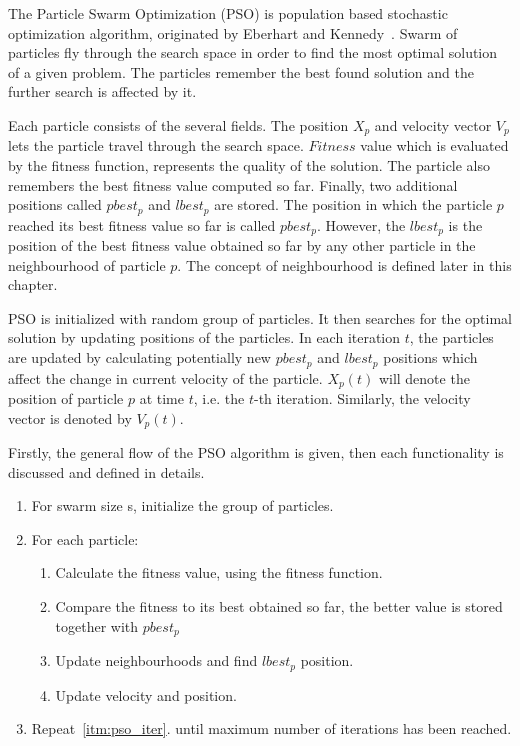 \documentclass{book}
\begin{document}
The Particle Swarm Optimization (PSO) is population based stochastic optimization algorithm, originated by Eberhart and Kennedy~\cite{pso_origin}. Swarm of particles fly through the search space in order to find the most optimal solution of a given problem. The particles remember the best found solution and the further search is affected by it.

Each particle consists of the several fields. The position $X_p$ and velocity vector $V_p$ lets the particle travel through the search space. $Fitness$ value which is evaluated by the fitness function, represents the quality of the solution. The particle also remembers the best fitness value computed so far. Finally, two additional positions called $pbest_p$ and $lbest_p$ are stored. The position in which the particle $p$ reached its best fitness value so far is called $pbest_p$. However, the $lbest_p$ is the position of the best fitness value obtained so far by any other particle in the neighbourhood of particle $p$. The concept of neighbourhood is defined later in this chapter.

PSO is initialized with random group of particles. It then searches for the optimal solution by updating positions of the particles.
In each iteration $t$, the particles are updated by calculating potentially new $pbest_p$ and $lbest_p$ positions which affect the change in current velocity of the particle. $X_p(t)$ will denote the position of particle $p$ at time $t$, i.e. the $t$-th iteration. Similarly, the velocity vector is denoted by $V_p(t)$.

Firstly, the general flow of the PSO algorithm is given, then each functionality is discussed and defined in details.

\begin{center}
    
    \begin{enumerate}
        \item For swarm size s, initialize the group of particles.
        
        \item For each particle: \label{itm:pso_iter}
        \begin{enumerate}
            \item Calculate the fitness value, using the fitness function.
            \item Compare the fitness to its best obtained so far, the better value is stored together with $pbest_p$	
            
            \item Update neighbourhoods and find $lbest_p$ position.
            
            \item Update velocity and position.	
        \end{enumerate}
        
        \item Repeat~\ref{itm:pso_iter}. until maximum number of iterations has been reached.
        
    \end{enumerate}
    
\end{center}
\end{document}
